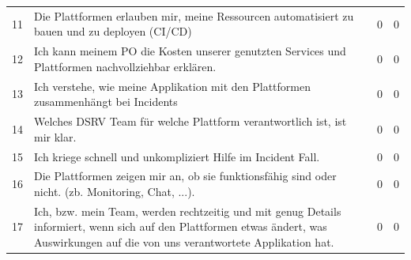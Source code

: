 \documentclass[a4paper,12pt]{article}
\begin{document}
\begin{table}[!htbp]
\begin{center}
\begin{tabularx}{\textwidth}{lXll}
                11 & Die Plattformen erlauben mir, meine Ressourcen automatisiert zu bauen und zu deployen (CI/CD) & 0 & 0  \\
                12 & Ich kann meinem PO die Kosten unserer genutzten Services und Plattformen nachvollziehbar erklären. & 0 & 0  \\
                13 & Ich verstehe, wie meine Applikation mit den Plattformen zusammenhängt bei Incidents & 0 & 0  \\
                14 & Welches DSRV Team für welche Plattform verantwortlich ist, ist mir klar.                                                                                                              & 0    & 0  \\
                15 & Ich kriege schnell und unkompliziert Hilfe im Incident Fall.                                                                                                                          & 0    & 0  \\
                16 & Die Plattformen zeigen mir an, ob sie funktionsfähig sind oder nicht. (zb. Monitoring, Chat, ...). & 0 & 0  \\
                17 & Ich, bzw. mein Team, werden rechtzeitig und mit genug Details informiert, wenn sich auf den Plattformen etwas ändert, was Auswirkungen auf die von uns verantwortete Applikation hat. & 0 & 0  \\
                \bottomrule
            \end{tabularx}
        \end{center}
    \end{table}
\end{document}
